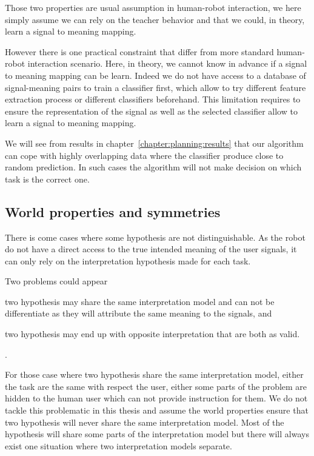 Those two properties are usual assumption in human-robot interaction, we here simply assume we can rely on the teacher behavior and that we could, in theory, learn a signal to meaning mapping.

However there is one practical constraint that differ from more standard human-robot interaction scenario. Here, in theory, we cannot know in advance if a signal to meaning mapping can be learn. Indeed we do not have access to a database of signal-meaning pairs to train a classifier first, which allow to try different feature extraction process or different classifiers beforehand. This limitation requires to ensure the representation of the signal as well as the selected classifier allow to learn a signal to meaning mapping. 

We will see from results in chapter~\ref{chapter:planning:results} that our algorithm can cope with highly overlapping data where the classifier produce close to random prediction. In such cases the algorithm will not make decision on which task is the correct one.

\subsection{World properties and symmetries}
\label{chapter:lfui:symmetries}

There is come cases where some hypothesis are not distinguishable. As the robot do not have a direct access to the true intended meaning of the user signals, it can only rely on the interpretation hypothesis made for each task.

Two problems could appear \begin{inparaenum}[a)] \item two hypothesis may share the same interpretation model and can not be differentiate as they will attribute the same meaning to the signals, and \item two hypothesis may end up with opposite interpretation that are both as valid. \end{inparaenum}.

For those case where two hypothesis share the same interpretation model, either the task are the same with respect the user, either some parts of the problem are hidden to the human user which can not provide instruction for them. We do not tackle this problematic in this thesis and assume the world properties ensure that two hypothesis will never share the same interpretation model. Most of the hypothesis will share some parts of the interpretation model but there will always exist one situation where two interpretation models separate.

